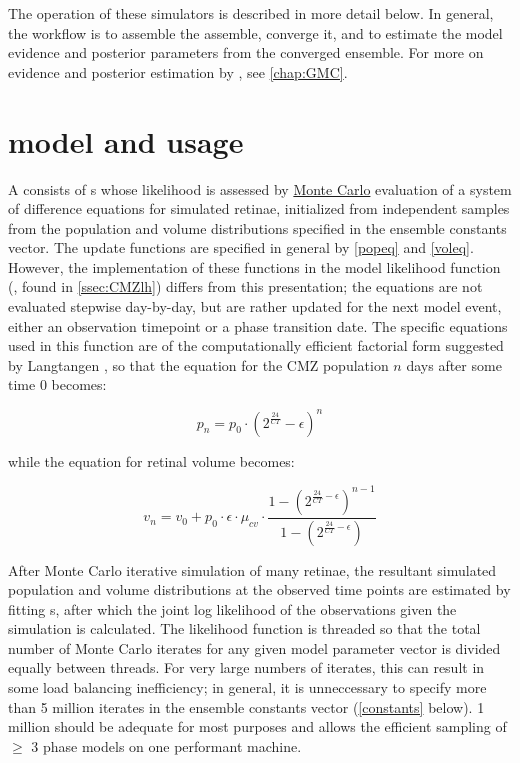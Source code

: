 The operation of these simulators is described in more detail below. In general, the workflow is to assemble the assemble, converge it, and to estimate the model evidence and posterior parameters from the converged ensemble. For more on evidence and posterior estimation by , see \autoref{chap:GMC}.

\section{\protect{} model and usage}
\label{sec:CMZmodel}
A  consists of s whose likelihood is assessed by \hyperref[ssec:MonteCarlo]{Monte Carlo} evaluation of a system of difference equations for simulated retinae, initialized from independent samples from the population and volume distributions specified in the ensemble constants vector. The update functions are specified in general by \autoref{popeq} and \autoref{voleq}. However, the implementation of these functions in the model likelihood function (, found in \autoref{ssec:CMZlh}) differs from this presentation; the equations are not evaluated stepwise day-by-day, but are rather updated for the next model event, either an observation timepoint or a phase transition date. The specific equations used in this function are of the computationally efficient factorial form suggested by Langtangen \cite[p. 559]{Langtangen2012}, so that the equation for the CMZ population $n$ days after some time 0 becomes:

\[
    p_n=p_{0} \cdot (2^{\frac{24}{CT}} - \epsilon)^{n}
\]

while the equation for retinal volume becomes:

\[
    v_n=v_{0} + p_{0} \cdot \epsilon \cdot \mu_{cv} \cdot \frac{1 - (2^{\frac{24}{CT} - \epsilon})^{n-1}}{1 - (2^{\frac{24}{CT} - \epsilon})}
\]

After Monte Carlo iterative simulation of many retinae, the resultant simulated population and volume distributions at the observed time points are estimated by fitting  s, after which the joint log likelihood of the observations given the simulation is calculated. The likelihood function is threaded so that the total number of Monte Carlo iterates for any given model parameter vector is divided equally between threads. For very large numbers of iterates, this can result in some load balancing inefficiency; in general, it is unneccessary to specify more than 5 million iterates in the ensemble constants vector (\autoref{constants} below). 1 million should be adequate for most purposes and allows the efficient sampling of $\geq$ 3 phase models on one performant machine.

